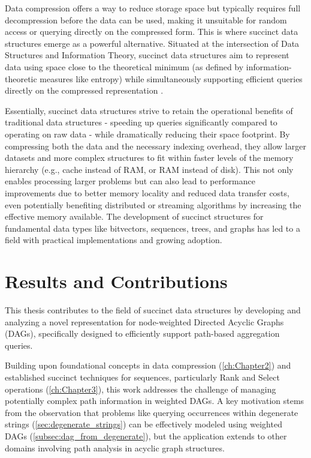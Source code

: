 Data compression offers a way to reduce storage space but typically requires full decompression before the data can be used, making it unsuitable for random access or querying directly on the compressed form. This is where succinct data structures emerge as a powerful alternative. Situated at the intersection of Data Structures and Information Theory, succinct data structures aim to represent data using space close to the theoretical minimum (as defined by information-theoretic measures like entropy) while simultaneously supporting efficient queries directly on the compressed representation \cite{navarro2016compact}.

Essentially, succinct data structures strive to retain the operational benefits of traditional data structures - speeding up queries significantly compared to operating on raw data - while dramatically reducing their space footprint. By compressing both the data and the necessary indexing overhead, they allow larger datasets and more complex structures to fit within faster levels of the memory hierarchy (e.g., cache instead of RAM, or RAM instead of disk). This not only enables processing larger problems but can also lead to performance improvements due to better memory locality and reduced data transfer costs, even potentially benefiting distributed or streaming algorithms by increasing the effective memory available. The development of succinct structures for fundamental data types like bitvectors, sequences, trees, and graphs has led to a field with practical implementations and growing adoption.

\section{Results and Contributions}
\label{sec:results_contributions}

This thesis contributes to the field of succinct data structures by developing and analyzing a novel representation for node-weighted Directed Acyclic Graphs (DAGs), specifically designed to efficiently support path-based aggregation queries.

Building upon foundational concepts in data compression (\autoref{ch:Chapter2}) and established succinct techniques for sequences, particularly Rank and Select operations (\autoref{ch:Chapter3}), this work addresses the challenge of managing potentially complex path information in weighted DAGs. A key motivation stems from the observation that problems like querying occurrences within degenerate strings (\autoref{sec:degenerate_strings}) can be effectively modeled using weighted DAGs (\autoref{subsec:dag_from_degenerate}), but the application extends to other domains involving path analysis in acyclic graph structures.

